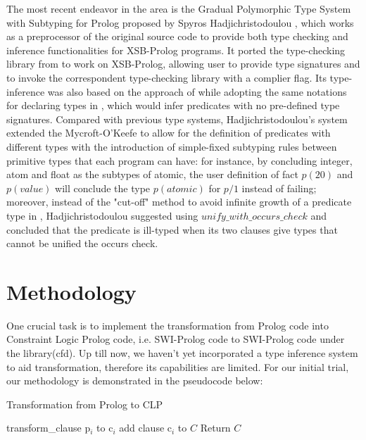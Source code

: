 \documentclass[12pt]{article}
\begin{document}
The most recent endeavor in the area is the Gradual Polymorphic Type System with Subtyping for Prolog proposed by Spyros Hadjichristodoulou \cite{hadjichristodoulou2012gradual}, which works as a preprocessor of the original source code to provide both type checking and inference functionalities for XSB-Prolog programs. It ported the type-checking library from \cite{schrijvers2008towards} to work on XSB-Prolog, allowing user to provide type signatures and to invoke the correspondent type-checking library with a complier flag. Its type-inference was also based on the approach of \cite{burstall1977transformation} while adopting the same notations for declaring types in \cite{mycroft1984polymorphic}, which would infer predicates with no pre-defined type signatures. Compared with previous type systems, Hadjichristodoulou's system extended the Mycroft-O'Keefe to allow for the definition of predicates with different types with the introduction of simple-fixed subtyping rules between primitive types that each program can have: for instance, by concluding integer, atom and float as the subtypes of atomic, the user definition of fact $p(20)$ and $p(value)$ will conclude the type $p(atomic)$ for $p/1$ instead of failing; moreover, instead of the "cut-off" method to avoid infinite growth of a predicate type in \cite{barbuti1992bottom}, Hadjichristodoulou suggested using $unify\_with\_occurs\_check$ and concluded that the predicate is ill-typed when its two clauses give types that cannot be unified the occurs check.

\section{Methodology}\label{methodology}

One crucial task is to implement the transformation from Prolog code into Constraint Logic Prolog code, i.e. SWI-Prolog code to SWI-Prolog code under the library(cfd). Up till now, we haven't yet incorporated a type inference system to aid transformation, therefore its capabilities are limited. For our initial trial, our methodology is demonstrated in the pseudocode below:

\begin{algorithm}
\caption{Transformation from Prolog to CLP}
\label{algo1}
\begin{algorithmic}[1]
        \State transform\_clause p$_i$ to c$_i$ 
        \State add clause c$_i$ to $C$
	\EndFor
	\State Return $C$
\EndProcedure
\end{algorithmic}
\end{algorithm}
\end{document}
